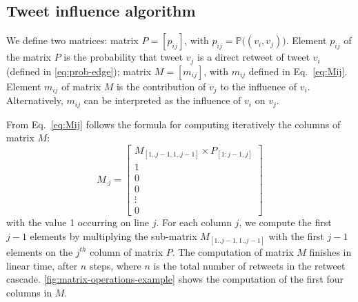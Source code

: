 


\subsection{Tweet influence algorithm}

We define two matrices:
matrix $P = [ p_{ij} ]$, with $p_{ij} = \mathds{P}\big((v_i, v_j)\big)$.
Element $p_{ij}$ of the matrix $P$ is the probability that tweet $v_j$ is a direct retweet of tweet $v_i$ (defined in \cref{eq:prob-edge});
matrix $M = [ m_{ij} ]$, with $m_{ij}$ defined in Eq.~\eqref{eq:Mij}.
Element $m_{ij}$ of matrix $M$ is the contribution of $v_j$ to the influence of $v_i$.
Alternatively, $m_{ij}$ can be interpreted as the influence of $v_i$ on $v_j$.

From Eq.~\eqref{eq:Mij} follows the formula for computing iteratively the columns of matrix $M$:
\begin{equation} \label{eq:Mij-matrix}
M_{ \cdot j}=
\left[
\begin{array}{c}
M_{[1..j-1, 1..j-1]} \times P_{[1:j-1,j]} \\
1 \\
0 \\
0 \\
\vdots \\
0
\end{array}
\right]
\end{equation}
with the value 1 occurring on line $j$.
For each column $j$, we compute the first $j-1$ elements by multiplying the sub-matrix $M_{[1..j-1, 1..j-1]}$ with the first $j-1$ elements on the $j^{th}$ column of matrix $P$.
The computation of matrix $M$ finishes in linear time, after $n$ steps, where $n$ is the total number of retweets in the retweet cascade.
\cref{fig:matrix-operations-example} shows the computation of the first four columns in $M$.
